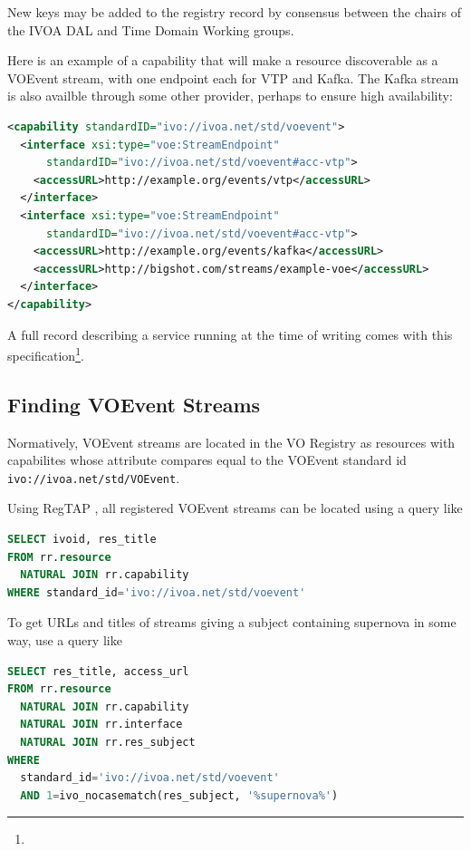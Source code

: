 \documentclass[11pt,a4paper]{ivoa}
\begin{document}
New keys may be added to the registry record by consensus between the
chairs of the IVOA DAL and Time Domain Working groups.

Here is an example of a capability that will make a resource
discoverable as a VOEvent stream, with one endpoint each for VTP and
Kafka.  The Kafka stream is also availble through some other
provider, perhaps to ensure high availability:

\begin{lstlisting}[language=XML]
<capability standardID="ivo://ivoa.net/std/voevent">
  <interface xsi:type="voe:StreamEndpoint"
      standardID="ivo://ivoa.net/std/voevent#acc-vtp">
    <accessURL>http://example.org/events/vtp</accessURL>
  </interface>
  <interface xsi:type="voe:StreamEndpoint"
      standardID="ivo://ivoa.net/std/voevent#acc-vtp">
    <accessURL>http://example.org/events/kafka</accessURL>
    <accessURL>http://bigshot.com/streams/example-voe</accessURL>
  </interface>
</capability>
\end{lstlisting}

A full record describing a service running at the time of writing
comes with this
specification\footnote{}.

\subsection{Finding VOEvent Streams}

Normatively, VOEvent streams are located in the VO Registry as resources
with capabilites whose  attribute compares equal to
the VOEvent standard id \nolinkurl{ivo://ivoa.net/std/VOEvent}.

Using RegTAP \citep{2019ivoa.spec.1011D}, all registered VOEvent streams
can be located using a query like

\begin{lstlisting}[language=SQL]
SELECT ivoid, res_title
FROM rr.resource
  NATURAL JOIN rr.capability
WHERE standard_id='ivo://ivoa.net/std/voevent'
\end{lstlisting}

To get URLs and titles of streams giving a subject containing supernova
in some way, use a query like

\begin{lstlisting}[language=SQL]
SELECT res_title, access_url
FROM rr.resource
  NATURAL JOIN rr.capability
  NATURAL JOIN rr.interface
  NATURAL JOIN rr.res_subject
WHERE 
  standard_id='ivo://ivoa.net/std/voevent'
  AND 1=ivo_nocasematch(res_subject, '%supernova%')
\end{lstlisting}
\end{document}
